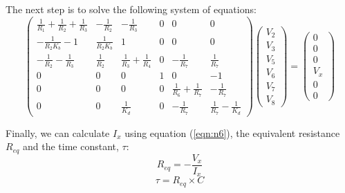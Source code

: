 The next step is to solve the following system of equations:
\begin{equation}
\left(\begin{array}{cccccc} \frac{1}{R_1}+\frac{1}{R_2} +\frac{1}{R_3} & -\frac{1}{R_2} & -\frac{1}{R_3} & 0 & 0 & 0\\ -\frac{1}{R_2 K_b}-1 & \frac{1}{R_2 K_b} & 1 & 0 & 0 & 0 \\ -\frac{1}{R_2}-\frac{1}{R_3} & \frac{1}{R_2} & \frac{1}{R_3}+\frac{1}{R_4} & 0& -\frac{1}{R_7} &\frac{1}{R_7} \\ 0&0&0&1&0&-1\\0&0&0&0&\frac{1}{R_6}+\frac{1}{R_7}&-\frac{1}{R_7} \\ 0&0&\frac{1}{K_d}&0&-\frac{1}{R_7}&\frac{1}{R_7}-\frac{1}{K_d}\end{array}\right)
\left(\begin{array}{c} V_2 \\ V_3 \\ V_5 \\ V_6 \\ V_7 \\ V_8 \end{array}\right) 
= \left(\begin{array}{c} 0 \\ 0 \\ 0 \\ V_x \\ 0 \\ 0 \end{array}\right)
\end{equation}

Finally, we can calculate $I_x$ using equation (\eqref{eqn:n6}), the equivalent resistance $R_{eq}$ and the time constant, $\tau$: 
\begin{equation}
R_{eq}=-\frac{V_x}{I_x}
\end{equation}
\begin{equation}
\tau=R_{eq}\times C
\end{equation}
